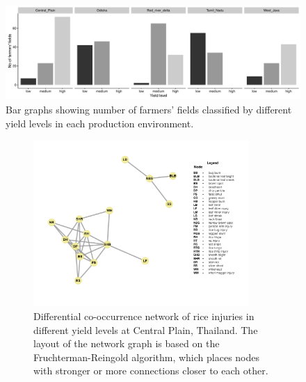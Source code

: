 \begin{figure}
    \centering
        \includegraphics[width = 1\textwidth]{figures/yield_level_bar/yield_level_bar.pdf}
\caption{Bar graphs showing number of farmers' fields classified by different yield levels in each production environment.}
\label{fig:yield_level_bar}
\end{figure}

\begin{figure}
    \centering
    \begin{subfigure}[b]{1\textwidth}
        \includegraphics[width = 0.9\textwidth]{figures/difyieldCP/difyieldCP.pdf}
        \caption[Differential co-occurrence network of rice injuries in different yield levels at Central Plain, Thailand]{Differential co-occurrence network of rice injuries in different yield levels at Central Plain, Thailand. The layout of the network graph is based on the Fruchterman-Reingold algorithm, which places nodes with stronger or more connections closer to each other.}
        \label{fig:difyieldnetwork_CP}
    \end{subfigure}
    \begin{subfigure}[b]{0.9\textwidth}

\end{subfigure}
\end{figure}
